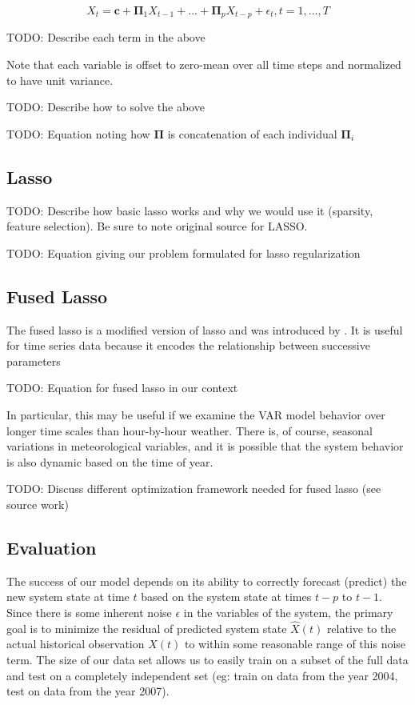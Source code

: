 \documentclass{article} %
\newcommand{\bs}{\boldsymbol}
\newcommand{\VARlag}{p}
\newcommand{\VARdata}{X}
\newcommand{\VARmodel}{\bs{\Pi}}
\newcommand{\VARoffset}{\bs{c}}
\newcommand {\VARnoise}{\epsilon}
\newcommand{\predicted}{\hat}
\begin{document}
\begin{equation}
\VARdata_t = \VARoffset + \VARmodel_1 \VARdata_{t-1} + ... +  \VARmodel_\VARlag \VARdata_{t-\VARlag} + \epsilon_t, t = 1, ...,T
\end{equation}

TODO: Describe each term in the above

Note that each variable is offset to zero-mean over all time steps and normalized to have unit variance.

TODO: Describe how to solve the above

TODO: Equation noting how $\VARmodel$ is concatenation of each individual $\VARmodel_i$

\subsection{Lasso}
TODO: Describe how basic lasso works and why we would use it (sparsity, feature selection). Be sure to note original \cite{Tibshirani1996} source for LASSO.

TODO: Equation giving our problem formulated for lasso regularization

\subsection{Fused Lasso}
The fused lasso is a modified version of lasso and was introduced by \cite{Tibshirani2005}. It is useful for time series data because it encodes the relationship between successive parameters

TODO: Equation for fused lasso in our context

In particular, this may be useful if we examine the VAR model behavior over longer time scales than hour-by-hour weather. There is, of course, seasonal variations in meteorological variables, and it is possible that the system behavior is also dynamic based on the time of year. 

TODO: Discuss different optimization framework needed for fused lasso (see source work)

\subsection{Evaluation}
The success of our model depends on its ability to correctly forecast (predict) the new system state at time $t$ based on the system state at times $t-\VARlag$ to $t-1$. Since there is some inherent noise $\VARnoise$ in the variables of the system, the primary goal is to minimize the residual of predicted system state $\predicted{\VARdata}(t)$ relative to the actual historical observation $\VARdata(t)$ to within some reasonable range of this noise term.  The size of our data set allows us to easily train on a subset of the full data and test on a completely independent set (eg: train on data from the year 2004, test on data from the year 2007).
\end{document}
